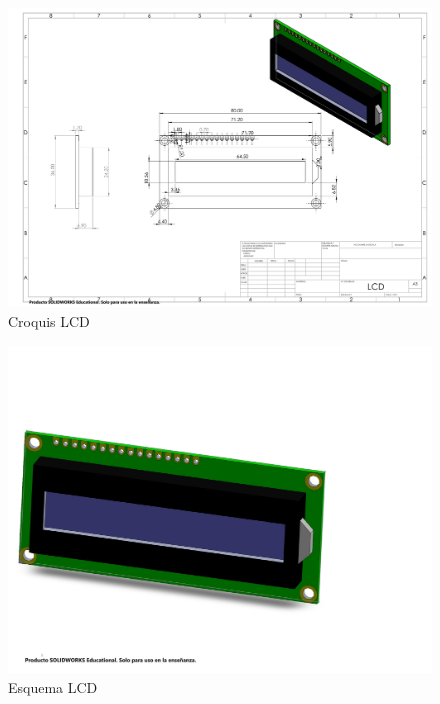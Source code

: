     \begin{figure}[H]
        \centering
        \includegraphics[trim = {1mm 1mm 1mm 1mm},clip,scale=0.2]{25/img/croquisLcd.PDF}
        \caption{Croquis LCD}
        \label{Croquis:lcd-16x2}
    \end{figure}
    \begin{figure}[H]
        \centering
        \includegraphics[trim = {10mm 10mm 10mm 10mm},clip,scale=0.2]{25/img/lcd.pdf}
        \caption{Esquema LCD}
        \label{fig:lcd-16x2}
    \end{figure}

